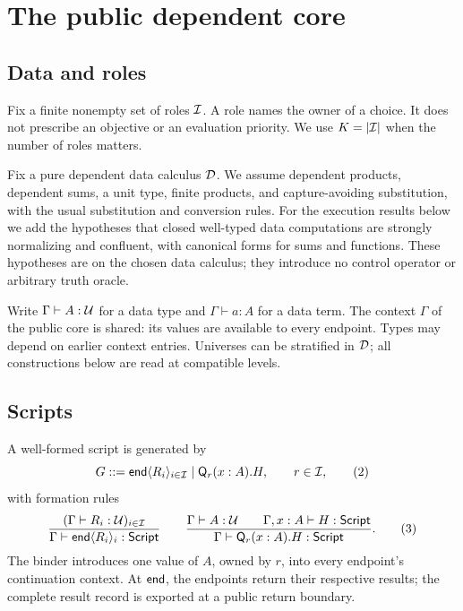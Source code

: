 \section{The public dependent core}
\label{sec:core}

\subsection{Data and roles}

Fix a finite nonempty set of roles $\mathcal I$. A role names the owner of a
choice. It does not prescribe an objective or an evaluation priority. We use
$K=|\mathcal I|$ when the number of roles matters.

Fix a pure dependent data calculus $\mathcal D$. We assume dependent products, dependent
sums, a unit type, finite products, and capture-avoiding substitution, with the
usual substitution and conversion rules. For the execution results below we
add the hypotheses that closed well-typed data computations are strongly
normalizing and confluent, with canonical forms for sums and functions.
These hypotheses are on the chosen data calculus; they introduce no control
operator or arbitrary truth oracle.

Write $\Gamma\vdash A:\mathcal U$ for a data type and $\Gamma\vdash a:A$ for a data
term. The context $\Gamma$ of the public core is shared: its values are
available to every endpoint. Types may depend on earlier context entries.
Universes can be stratified in $\mathcal D$; all constructions below are read at
compatible levels.

\subsection{Scripts}

\begin{definition}
A well-formed script is generated by
\[
 G ::= \mathsf{end}\langle R_i\rangle_{i\in\mathcal I}
       \mid \mathsf Q_r(x:A).H,
 \qquad r\in\mathcal I,
 \tag{2}
\]
with formation rules
\[
 \frac{(\Gamma\vdash R_i:\mathcal U)_{i\in\mathcal I}}
      {\Gamma\vdash\mathsf{end}\langle R_i\rangle_i:\mathsf{Script}}
 \qquad
 \frac{\Gamma\vdash A:\mathcal U\qquad\Gamma,x:A\vdash H:\mathsf{Script}}
      {\Gamma\vdash\mathsf Q_r(x:A).H:\mathsf{Script}}.
 \tag{3}
\]
The binder introduces one value of $A$, owned by $r$, into every endpoint's
continuation context. At $\mathsf{end}$, the endpoints return their respective results;
the complete result record is exported at a public return boundary.
\end{definition}

